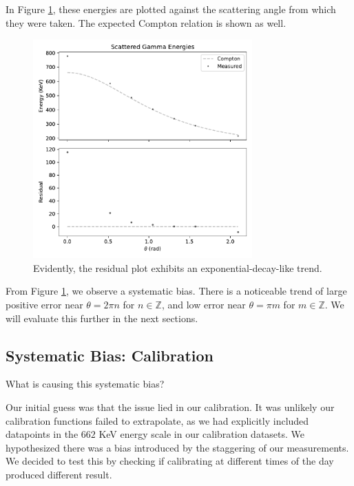 \documentclass[12pt, letterpaper]{article}
\begin{document}
In Figure \ref{fig:scattering-1}, these energies are plotted against the scattering angle from which they were taken. The expected Compton relation is shown as well. 

\begin{figure}[!h]
    \centering
    \includegraphics[width=0.75\textwidth]{experiment2/figures/scattering1.pdf}
    \caption{Evidently, the residual plot exhibits an exponential-decay-like trend. }
    \label{fig:scattering-1}
\end{figure}

From Figure \ref{fig:scattering-1}, we observe a systematic bias. There is a noticeable trend of large positive error near $\theta = 2 \pi n$ for $n \in \mathbb{Z}$, and low error near $\theta = \pi m$ for $m \in \mathbb{Z}$. We will evaluate this further in the next sections. 

\subsection{Systematic Bias: Calibration}

What is causing this systematic bias?

Our initial guess was that the issue lied in our calibration. It was unlikely our calibration functions failed to extrapolate, as we had explicitly included datapoints in the $662$ KeV energy scale in our calibration datasets. We hypothesized there was a bias introduced by the staggering of our measurements. We decided to test this by checking if calibrating at different times of the day produced different result. 
\end{document}
